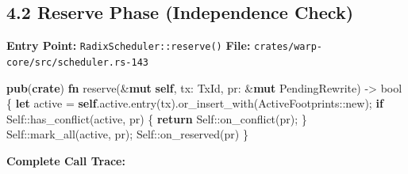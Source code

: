 \documentclass[11pt]{book}
\newenvironment{Shaded}{}{}
\newcommand{\ControlFlowTok}[1]{\textcolor[rgb]{0.00,0.44,0.13}{\textbf{#1}}}
\newcommand{\DataTypeTok}[1]{\textcolor[rgb]{0.56,0.13,0.00}{#1}}
\newcommand{\KeywordTok}[1]{\textcolor[rgb]{0.00,0.44,0.13}{\textbf{#1}}}
\newcommand{\NormalTok}[1]{#1}
\newcommand{\OperatorTok}[1]{\textcolor[rgb]{0.40,0.40,0.40}{#1}}
\newcommand{\PreprocessorTok}[1]{\textcolor[rgb]{0.74,0.48,0.00}{#1}}
\begin{document}
\subsection{4.2 Reserve Phase (Independence
Check)}\label{reserve-phase-independence-check}

\textbf{Entry Point:} \texttt{RadixScheduler::reserve()} \textbf{File:}
\texttt{crates/warp-core/src/scheduler.rs-143}

\begin{Shaded}
\begin{Highlighting}[]
\KeywordTok{pub}\NormalTok{(}\KeywordTok{crate}\NormalTok{) }\KeywordTok{fn}\NormalTok{ reserve(}\OperatorTok{\&}\KeywordTok{mut} \KeywordTok{self}\OperatorTok{,}\NormalTok{ tx}\OperatorTok{:}\NormalTok{ TxId}\OperatorTok{,}\NormalTok{ pr}\OperatorTok{:} \OperatorTok{\&}\KeywordTok{mut}\NormalTok{ PendingRewrite) }\OperatorTok{{-}\textgreater{}} \DataTypeTok{bool} \OperatorTok{\{}
    \KeywordTok{let}\NormalTok{ active }\OperatorTok{=} \KeywordTok{self}\OperatorTok{.}\NormalTok{active}\OperatorTok{.}\NormalTok{entry(tx)}\OperatorTok{.}\NormalTok{or\_insert\_with(}\PreprocessorTok{ActiveFootprints::}\NormalTok{new)}\OperatorTok{;}
    \ControlFlowTok{if} \DataTypeTok{Self}\PreprocessorTok{::}\NormalTok{has\_conflict(active}\OperatorTok{,}\NormalTok{ pr) }\OperatorTok{\{}
        \ControlFlowTok{return} \DataTypeTok{Self}\PreprocessorTok{::}\NormalTok{on\_conflict(pr)}\OperatorTok{;}
    \OperatorTok{\}}
    \DataTypeTok{Self}\PreprocessorTok{::}\NormalTok{mark\_all(active}\OperatorTok{,}\NormalTok{ pr)}\OperatorTok{;}
    \DataTypeTok{Self}\PreprocessorTok{::}\NormalTok{on\_reserved(pr)}
\OperatorTok{\}}
\end{Highlighting}
\end{Shaded}

\textbf{Complete Call Trace:}
\end{document}
